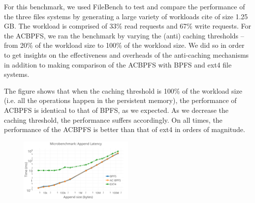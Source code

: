  For this benchmark, we used FileBench to test and compare the performance of the three files systems by generating a large variety of workloads {cite} of size 1.25 GB. The workload is comprised of 33\% read requests and 67\% write requests. For the AC\-BPFS, we ran the benchmark by varying the (anti) caching thresholds – from 20\% of the workload size to 100\% of the workload size. We did so in order to get insights on the effectiveness and overheads of the anti-caching mechanisms in addition to making comparison of the AC\-BPFS with BPFS and ext4 file systems.

The figure shows that when the caching threshold is 100\% of the workload size (i.e. all the operations happen in the persistent memory), the performance of AC\-BPFS is identical to that of BPFS, as we expected. As we decrease the caching threshold, the performance suffers accordingly. On all times, the performance of the AC\-BPFS is better than that of ext4 in orders of magnitude.


\begin{figure}
\centering
\vspace{-0.2in}
\includegraphics[width=0.5\textwidth]{figs/append.png}
\vspace{-0.2in}
\end{figure}

 


